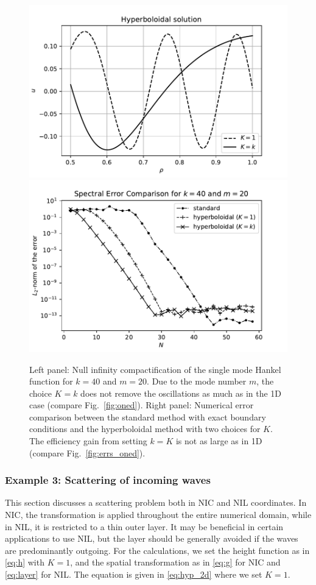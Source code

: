 \documentclass[final,onefignum,onetabnum]{siamart190516}
\begin{document}
\begin{figure}[tbhp]
	\centering
	\includegraphics[scale=0.4]{figs/hyp_twod}
	\includegraphics[scale=0.4]{figs/sp_err_2d}
	\caption{Left panel: Null infinity compactification of the single mode Hankel function for $k=40$ and $m=20$. Due to the mode number $m$, the choice $K=k$ does not remove the oscillations as much as in the 1D case (compare Fig.~\ref{fig:oned}). Right panel: Numerical error comparison between the standard method with exact boundary conditions and the hyperboloidal method with two choices for $K$. The efficiency gain from setting $k=K$ is not as large as in 1D (compare Fig.~\ref{fig:errs_oned}). }
	\label{fig:twod}
\end{figure}



\subsubsection{Example 3: Scattering of incoming waves}
This section discusses a scattering problem both in NIC and NIL coordinates. In NIC, the transformation is applied throughout the entire numerical domain, while in NIL, it is restricted to a thin outer layer.  It may be beneficial in certain applications to use NIL, but the layer should be generally avoided if the waves are predominantly outgoing. For the calculations, we set the height function as in \eqref{eq:h} with $K=1$,  and the spatial transformation as in \eqref{eq:g} for NIC and \eqref{eq:layer} for NIL. The equation is given in \eqref{eq:hyp_2d} where we set $K=1$.
\end{document}
